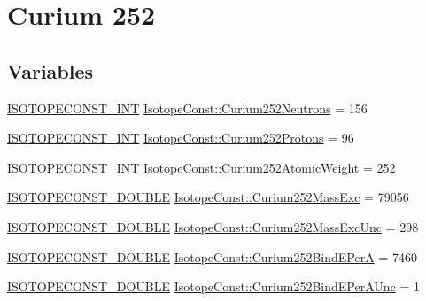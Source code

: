 \hypertarget{group___isotope_const-_curium-_cm252}{}\section{Curium 252}
\label{group___isotope_const-_curium-_cm252}
\subsection*{Variables}
\begin{DoxyCompactItemize}
\item 
\mbox{\hyperlink{group___isotope_const-_macros_ga5f18360b3e99483a35c32d789e62621c}{I\+S\+O\+T\+O\+P\+E\+C\+O\+N\+S\+T\+\_\+\+I\+NT}} \mbox{\hyperlink{group___isotope_const-_curium-_cm252_gaa6aa02185192dfccb248d275fdcb13ee}{Isotope\+Const\+::\+Curium252\+Neutrons}} = 156
\item 
\mbox{\hyperlink{group___isotope_const-_macros_ga5f18360b3e99483a35c32d789e62621c}{I\+S\+O\+T\+O\+P\+E\+C\+O\+N\+S\+T\+\_\+\+I\+NT}} \mbox{\hyperlink{group___isotope_const-_curium-_cm252_ga0a4f0cbbffc38e09075f3d9a99787805}{Isotope\+Const\+::\+Curium252\+Protons}} = 96
\item 
\mbox{\hyperlink{group___isotope_const-_macros_ga5f18360b3e99483a35c32d789e62621c}{I\+S\+O\+T\+O\+P\+E\+C\+O\+N\+S\+T\+\_\+\+I\+NT}} \mbox{\hyperlink{group___isotope_const-_curium-_cm252_gab32e04532def60a166bd28d512f60e3e}{Isotope\+Const\+::\+Curium252\+Atomic\+Weight}} = 252
\item 
\mbox{\hyperlink{group___isotope_const-_macros_ga8f45a7272ce02c0b4c65c44636ed719a}{I\+S\+O\+T\+O\+P\+E\+C\+O\+N\+S\+T\+\_\+\+D\+O\+U\+B\+LE}} \mbox{\hyperlink{group___isotope_const-_curium-_cm252_gacbb79efde654bc41cab6d52896812c77}{Isotope\+Const\+::\+Curium252\+Mass\+Exc}} = 79056
\item 
\mbox{\hyperlink{group___isotope_const-_macros_ga8f45a7272ce02c0b4c65c44636ed719a}{I\+S\+O\+T\+O\+P\+E\+C\+O\+N\+S\+T\+\_\+\+D\+O\+U\+B\+LE}} \mbox{\hyperlink{group___isotope_const-_curium-_cm252_gadacec3e8e8915a1b3ec148b2d5f7cdc2}{Isotope\+Const\+::\+Curium252\+Mass\+Exc\+Unc}} = 298
\item 
\mbox{\hyperlink{group___isotope_const-_macros_ga8f45a7272ce02c0b4c65c44636ed719a}{I\+S\+O\+T\+O\+P\+E\+C\+O\+N\+S\+T\+\_\+\+D\+O\+U\+B\+LE}} \mbox{\hyperlink{group___isotope_const-_curium-_cm252_gaa59cc937f9d2df765217c79a591cd047}{Isotope\+Const\+::\+Curium252\+Bind\+E\+PerA}} = 7460
\item 
\mbox{\hyperlink{group___isotope_const-_macros_ga8f45a7272ce02c0b4c65c44636ed719a}{I\+S\+O\+T\+O\+P\+E\+C\+O\+N\+S\+T\+\_\+\+D\+O\+U\+B\+LE}} \mbox{\hyperlink{group___isotope_const-_curium-_cm252_ga334fbf44bccaadbbf0e1f33568637156}{Isotope\+Const\+::\+Curium252\+Bind\+E\+Per\+A\+Unc}} = 1

\end{DoxyCompactItemize}
